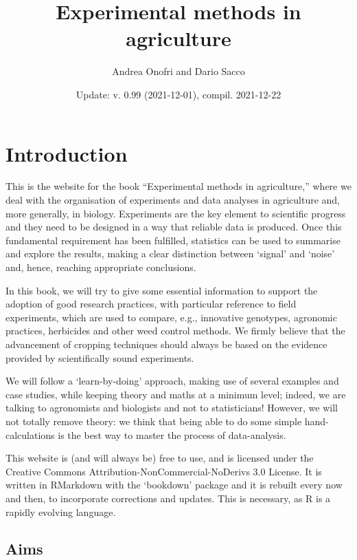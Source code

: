\documentclass[a4paper,12pt,oneside]{book}
\author{Andrea Onofri and Dario Sacco}
\date{Update: v. 0.99 (2021-12-01), compil. 2021-12-22}
\title{Experimental methods in agriculture}
\subtitle{}
\begin{document}
\maketitle
\tableofcontents

\hypertarget{introduction}{%
\chapter*{Introduction}\label{introduction}}

This is the website for the book ``Experimental methods in agriculture,'' where we deal with the organisation of experiments and data analyses in agriculture and, more generally, in biology. Experiments are the key element to scientific progress and they need to be designed in a way that reliable data is produced. Once this fundamental requirement has been fulfilled, statistics can be used to summarise and explore the results, making a clear distinction between `signal' and `noise' and, hence, reaching appropriate conclusions.

In this book, we will try to give some essential information to support the adoption of good research practices, with particular reference to field experiments, which are used to compare, e.g., innovative genotypes, agronomic practices, herbicides and other weed control methods. We firmly believe that the advancement of cropping techniques should always be based on the evidence provided by scientifically sound experiments.

We will follow a `learn-by-doing' approach, making use of several examples and case studies, while keeping theory and maths at a minimum level; indeed, we are talking to agronomists and biologists and not to statisticians! However, we will not totally remove theory: we think that being able to do some simple hand-calculations is the best way to master the process of data-analysis.

This website is (and will always be) free to use, and is licensed under the Creative Commons Attribution-NonCommercial-NoDerivs 3.0 License. It is written in RMarkdown with the `bookdown' package and it is rebuilt every now and then, to incorporate corrections and updates. This is necessary, as R is a rapidly evolving language.

\hypertarget{aims}{%
\section*{Aims}\label{aims}}
\end{document}
